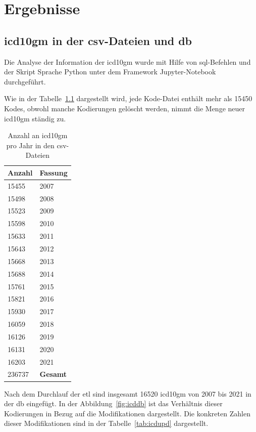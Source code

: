 \chapter{Ergebnisse} \label{ch:results}

\section{\acs{icd10gm} in der \acs{csv}-Dateien und \acs{db}} \label{sec:dataanalysis}
Die Analyse der Information der \ac{icd10gm} wurde mit Hilfe von \ac{sql}-Befehlen und der Skript Sprache Python unter dem Framework Jupyter-Notebook durchgeführt.

Wie in der Tabelle~\ref{tab:icdfiles} dargestellt wird, jede Kode-Datei enthält mehr als 15450 Kodes, obwohl manche Kodierungen gelöscht werden, nimmt die Menge neuer \ac{icd10gm} ständig zu.

\begin{table}[ht]
	\centering
	\small
	\caption[\acs{icd10gm} in den \acs{csv}-Dateien]{Anzahl an \acs{icd10gm} pro Jahr in den \ac{csv}-Dateien}
	\label{tab:icdfiles}
	\begin{tabular}{|l|l|}
		\hline
	\rowcolor{lightgray} Anzahl & Fassung \\ \hline 
		15455 & 2007 \\ \hline
		15498 & 2008 \\ \hline
		15523 & 2009 \\ \hline
		15598 & 2010 \\ \hline
		15633 & 2011 \\ \hline
		15643 & 2012 \\ \hline
		15668 & 2013 \\ \hline
		15688 & 2014 \\ \hline
		15761 & 2015 \\ \hline
		15821 & 2016 \\ \hline
		15930 & 2017 \\ \hline
		16059 & 2018 \\ \hline
		16126 & 2019 \\ \hline
		16131 & 2020 \\ \hline
		16203 & 2021 \\ \hline
		\hline
		236737 & \textbf{Gesamt} \\ \hline
	\end{tabular}
	\end{table}

Nach dem Durchlauf der \ac{etl} sind insgesamt 16520 \ac{icd10gm} von 2007 bis 2021 in der \ac{db} eingefügt. In der Abbildung~\ref{fig:icddb} ist das Verhältnis dieser Kodierungen in Bezug auf die Modifikationen dargestellt. Die konkreten Zahlen dieser Modifikationen sind in der Tabelle~\ref{tab:icdupd} dargestellt. 
 
